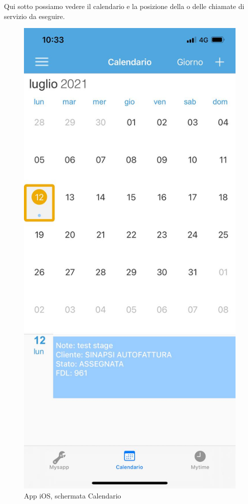 Qui sotto possiamo vedere il calendario e la posizione della o delle chiamate di servizio da eseguire.\\
\begin{figure}[!h] 
	\centering 
	\includegraphics[scale = 0.13]{immagini/app iOS/calendario-iOS.jpeg} 
	\caption {App iOS, schermata Calendario}
\end{figure}
